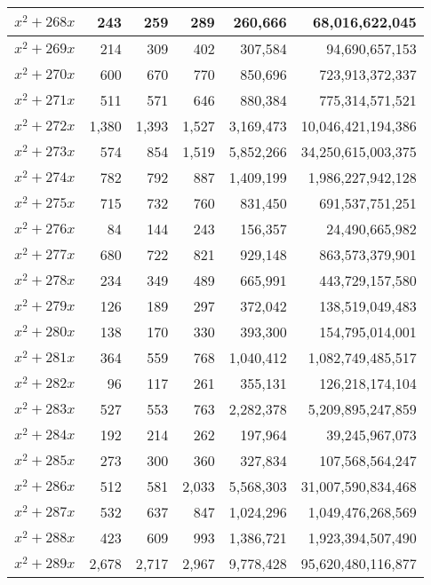 \documentclass[a4paper]{amsproc}
\theoremstyle{plain}
\theoremstyle{named}
\begin{document}
\begin{longtable}{ | l | r | r | r | r | r | }
$x^2 + 268x$ & 243 & 259 & 289 & 260{,}666 & 68{,}016{,}622{,}045 \\ \hline
$x^2 + 269x$ & 214 & 309 & 402 & 307{,}584 & 94{,}690{,}657{,}153 \\ \hline
$x^2 + 270x$ & 600 & 670 & 770 & 850{,}696 & 723{,}913{,}372{,}337 \\ \hline
$x^2 + 271x$ & 511 & 571 & 646 & 880{,}384 & 775{,}314{,}571{,}521 \\ \hline
$x^2 + 272x$ & 1{,}380 & 1{,}393 & 1{,}527 & 3{,}169{,}473 & 10{,}046{,}421{,}194{,}386 \\ \hline
$x^2 + 273x$ & 574 & 854 & 1{,}519 & 5{,}852{,}266 & 34{,}250{,}615{,}003{,}375 \\ \hline
$x^2 + 274x$ & 782 & 792 & 887 & 1{,}409{,}199 & 1{,}986{,}227{,}942{,}128 \\ \hline
$x^2 + 275x$ & 715 & 732 & 760 & 831{,}450 & 691{,}537{,}751{,}251 \\ \hline
$x^2 + 276x$ & 84 & 144 & 243 & 156{,}357 & 24{,}490{,}665{,}982 \\ \hline
$x^2 + 277x$ & 680 & 722 & 821 & 929{,}148 & 863{,}573{,}379{,}901 \\ \hline
$x^2 + 278x$ & 234 & 349 & 489 & 665{,}991 & 443{,}729{,}157{,}580 \\ \hline
$x^2 + 279x$ & 126 & 189 & 297 & 372{,}042 & 138{,}519{,}049{,}483 \\ \hline
$x^2 + 280x$ & 138 & 170 & 330 & 393{,}300 & 154{,}795{,}014{,}001 \\ \hline
$x^2 + 281x$ & 364 & 559 & 768 & 1{,}040{,}412 & 1{,}082{,}749{,}485{,}517 \\ \hline
$x^2 + 282x$ & 96 & 117 & 261 & 355{,}131 & 126{,}218{,}174{,}104 \\ \hline
$x^2 + 283x$ & 527 & 553 & 763 & 2{,}282{,}378 & 5{,}209{,}895{,}247{,}859 \\ \hline
$x^2 + 284x$ & 192 & 214 & 262 & 197{,}964 & 39{,}245{,}967{,}073 \\ \hline
$x^2 + 285x$ & 273 & 300 & 360 & 327{,}834 & 107{,}568{,}564{,}247 \\ \hline
$x^2 + 286x$ & 512 & 581 & 2{,}033 & 5{,}568{,}303 & 31{,}007{,}590{,}834{,}468 \\ \hline
$x^2 + 287x$ & 532 & 637 & 847 & 1{,}024{,}296 & 1{,}049{,}476{,}268{,}569 \\ \hline
$x^2 + 288x$ & 423 & 609 & 993 & 1{,}386{,}721 & 1{,}923{,}394{,}507{,}490 \\ \hline
$x^2 + 289x$ & 2{,}678 & 2{,}717 & 2{,}967 & 9{,}778{,}428 & 95{,}620{,}480{,}116{,}877 \\ \hline

\end{longtable}
\end{document}

